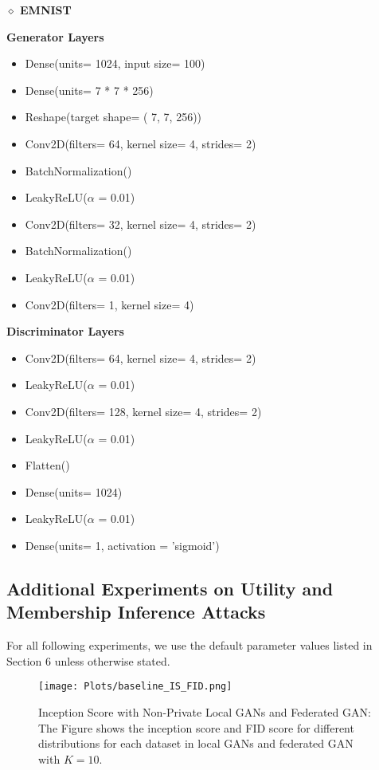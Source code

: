 \textbf{$\diamond$ EMNIST}



\textbf{Generator Layers}
\begin{itemize}

\item Dense(units= 1024, input size= 100)
\item Dense(units= 7 * 7 * 256)
\item Reshape(target shape= ( 7, 7, 256))
\item Conv2D(filters= 64, kernel size= 4, strides= 2)
\item BatchNormalization()
\item LeakyReLU($\alpha$ = 0.01)
\item Conv2D(filters= 32, kernel size= 4, strides= 2)
\item BatchNormalization()
\item LeakyReLU($\alpha$ = 0.01)
\item Conv2D(filters= 1, kernel size= 4)


\end{itemize}

\textbf{Discriminator Layers}
\begin{itemize}

\item Conv2D(filters= 64, kernel size= 4, strides= 2)
\item LeakyReLU($\alpha$ = 0.01)
\item Conv2D(filters= 128, kernel size= 4, strides= 2)
\item LeakyReLU($\alpha$ = 0.01)
\item Flatten()
\item Dense(units= 1024)
\item LeakyReLU($\alpha$ = 0.01)
\item Dense(units= 1, activation = ’sigmoid’)
\end{itemize}



\subsection{ Additional Experiments on Utility and Membership Inference Attacks}


For all following experiments, we use the default parameter values listed in Section 6 unless otherwise stated.






\begin{figure}
 \centering
 \texttt{[image: Plots/baseline\_IS\_FID.png]}
 \caption{Inception Score with Non-Private Local GANs and Federated GAN: The Figure shows the inception score and FID score for different distributions for each dataset in local GANs and federated  GAN with $K=10$. }
 \label{fig:baseline_IS}
\end{figure}








